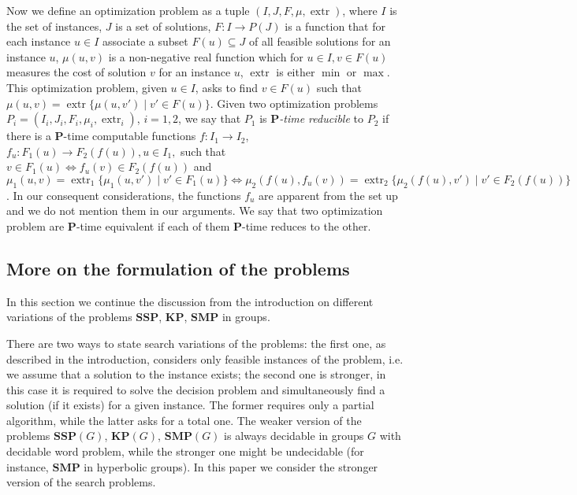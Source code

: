 \documentclass[11pt]{amsart}
\theoremstyle{definition}
\def\P{{\mathbf{P}}}
\def\SSP{{\mathbf{SSP}}}
\def\SMP{{\mathbf{SMP}}}
\def\KP{{\mathbf{KP}}}
\begin{document}
Now we define an optimization problem as a  tuple $(I,J, F,\mu,{\mathop{\mathrm{extr}}})$, where $I$ is the set of instances, $J$ is a set of solutions, $F:I \to P(J)$ is a function that for each instance $u \in I$ associate a subset  $F(u)\subseteq J$  of all feasible solutions for an instance $u$, $\mu(u,v)$ is a non-negative real function  which for $u \in I, v \in F(u)$ measures the cost of solution $v$ for an instance $u$,  ${\mathop{\mathrm{extr}}}$ is either $\min$ or $\max$. This optimization problem, given $u\in I$, asks to find $v\in F(u)$ such that $\mu(u,v)={\mathop{\mathrm{extr}}}\{\mu(u,v')\mid v'\in F(u)\}$. Given two optimization problems $P_i=(I_i,J_i, F_i,\mu_i,{\mathop{\mathrm{extr}}}_i)$, $i=1,2$, we say that $P_1$ is {\em $\P$-time reducible} to $P_2$ if there is a $\P$-time computable functions $f:I_1\to I_2$, $f_u:F_1(u)\to F_2(f(u)), u\in I_1,$ such that $v\in F_1(u)\iff f_u(v)\in F_2(f(u))$ and $\mu_1(u,v)={\mathop{\mathrm{extr}}}_1\{\mu_1(u,v')\mid v'\in F_1(u)\} \Longleftrightarrow \mu_2(f(u),f_u(v))={\mathop{\mathrm{extr}}}_2\{\mu_2(f(u),v')\mid v'\in F_2(f(u))\}$. In our consequent considerations, the functions $f_u$ are apparent from the set up and we do not mention them in our arguments. We say that two optimization problem are $\P$-time equivalent if each of them $\P$-time reduces to the other.


\subsection{More on the formulation of the problems}
\label{se:formulation}
In this section we continue the discussion from the introduction on  different variations of the problems $\SSP$, $\KP$, $\SMP$ in groups.

There are two ways to state search variations of the problems: the first one, as described  in the introduction, considers only feasible instances of the problem, i.e.
we assume that a solution to the instance exists; the second one is stronger, in this case it is required to solve the decision problem and simultaneously find a solution (if it exists) for a given instance. The former requires only a partial algorithm, while the latter asks for a total one. The weaker version of the problems $\SSP(G)$, $\KP(G)$, $\SMP(G)$ is always decidable in groups $G$  with decidable word problem, while the stronger one might be undecidable (for instance, $\SMP$ in hyperbolic groups). In this paper we consider the stronger version of the search problems.
\end{document}
